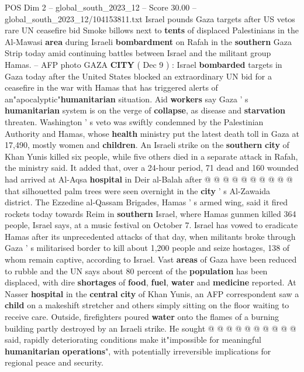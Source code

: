 \begin{textsample}{POS Dim 2 – global\_south\_2023\_12 – Score 30.00 – global\_south\_2023\_12/104153811.txt}  \label{ex:f2_pos_026}
Israel pounds Gaza targets after US vetos rare UN ceasefire bid Smoke billows next to \textbf{tents} of displaced Palestinians in the Al-Mawasi \textbf{area} during Israeli \textbf{bombardment} on Rafah in the \textbf{southern} Gaza Strip today amid continuing battles between Israel and the militant group Hamas. -- AFP photo GAZA \textbf{CITY} ( Dec 9 ) : Israel \textbf{bombarded} targets in Gaza today after the United States blocked an extraordinary UN bid for a ceasefire in the war with Hamas that has triggered alerts of an"apocalyptic"\textbf{humanitarian} situation.
Aid \textbf{workers} say Gaza ' s \textbf{humanitarian} system is on the verge of \textbf{collapse}, as disease and \textbf{starvation} threaten.
Washington ' s veto was swiftly condemned by the Palestinian Authority and Hamas, whose \textbf{health} ministry put the latest death toll in Gaza at 17,490, mostly women and \textbf{children}.
An Israeli strike on the \textbf{southern} \textbf{city} of Khan Yunis killed six people, while five others died in a separate attack in Rafah, the ministry said.
It added that, over a 24-hour period, 71 dead and 160 wounded had arrived at Al-Aqsa \textbf{hospital} in Deir al-Balah after @ @ @ @ @ @ @ @ @ @ that silhouetted palm trees were seen overnight in the \textbf{city} ' s Al-Zawaida district.
The Ezzedine al-Qassam Brigades, Hamas ' s armed wing, said it fired rockets today towards Reim in \textbf{southern} Israel, where Hamas gunmen killed 364 people, Israel says, at a music festival on October 7.
Israel has vowed to eradicate Hamas after its unprecedented attacks of that day, when militants broke through Gaza ' s militarised border to kill about 1,200 people and seize hostages, 138 of whom remain captive, according to Israel.
Vast \textbf{areas} of Gaza have been reduced to rubble and the UN says about 80 percent of the \textbf{population} has been displaced, with dire \textbf{shortages} of \textbf{food}, \textbf{fuel}, \textbf{water} and \textbf{medicine} reported.
At Nasser \textbf{hospital} in the \textbf{central} \textbf{city} of Khan Yunis, an AFP correspondent saw a \textbf{child} on a makeshift stretcher and others simply sitting on the floor waiting to receive care.
Outside, firefighters poured \textbf{water} onto the flames of a burning building partly destroyed by an Israeli strike.
He sought @ @ @ @ @ @ @ @ @ @ said, rapidly deteriorating conditions make it"impossible for meaningful \textbf{humanitarian} \textbf{operations}", with potentially irreversible implications for regional peace and security.

\end{textsample}
